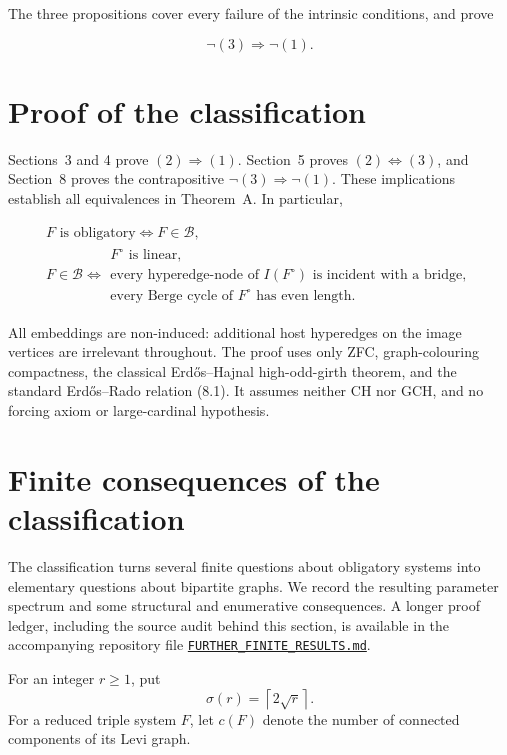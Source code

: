 \documentclass[a4paper,11pt,reqno]{amsart}
\theoremstyle{plain}
\theoremstyle{definition}
\theoremstyle{remark}
\begin{document}
The three propositions cover every failure of the intrinsic conditions, and prove

\[
\neg(3)\Longrightarrow\neg(1). \tag{8.2}
\]

\section{Proof of the classification}\label{conclusion}

Sections~3 and 4 prove \((2)\Longrightarrow(1)\). Section~5 proves
\((2)\Longleftrightarrow(3)\), and Section~8 proves the contrapositive
\(\neg(3)\Longrightarrow\neg(1)\). These implications establish all
equivalences in Theorem~A. In particular,

\begingroup\small
\[
\begin{gathered}
F\text{ is obligatory}
\iff
F\in\mathcal B,\\[1mm]
F\in\mathcal B
\iff
\begin{array}{l}
F^\circ\text{ is linear},\\[1mm]
\text{every hyperedge-node of }I(F^\circ)
\text{ is incident with a bridge},\\[1mm]
\text{every Berge cycle of }F^\circ\text{ has even length}.
\end{array}
\end{gathered}
\]
\endgroup

All embeddings are non-induced: additional host hyperedges on the image vertices are irrelevant throughout. The proof uses only ZFC, graph-colouring compactness, the classical Erd\H{o}s--Hajnal high-odd-girth theorem, and the standard Erd\H{o}s--Rado relation (8.1). It assumes neither CH nor GCH, and no forcing axiom or large-cardinal hypothesis.


\section{Finite consequences of the classification}\label{finite-consequences}

The classification turns several finite questions about obligatory systems
into elementary questions about bipartite graphs.  We record the resulting
parameter spectrum and some structural and enumerative consequences.  A
longer proof ledger, including the source audit behind this section, is
available in the accompanying repository file
\href{https://github.com/SamPetkov/Erdos593/blob/main/FURTHER_FINITE_RESULTS.md}{\texttt{FURTHER\_FINITE\_RESULTS.md}}.

For an integer $r\ge1$, put
\[
\sigma(r)=\left\lceil2\sqrt r\right\rceil.
\]
For a reduced triple system $F$, let $c(F)$ denote the number of connected
components of its Levi graph.
\end{document}
